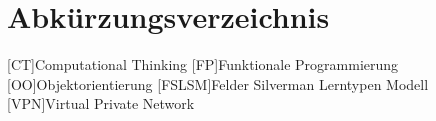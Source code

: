 \clearpage
\section*{Abkürzungsverzeichnis}
\label{sec:abbreviations}

\begin{acronym}[]
    [CT]{Computational Thinking}
    [FP]{Funktionale Programmierung}
    [OO]{Objektorientierung}
    [FSLSM]{Felder Silverman Lerntypen Modell}
    [VPN]{Virtual Private Network}
\end{acronym}